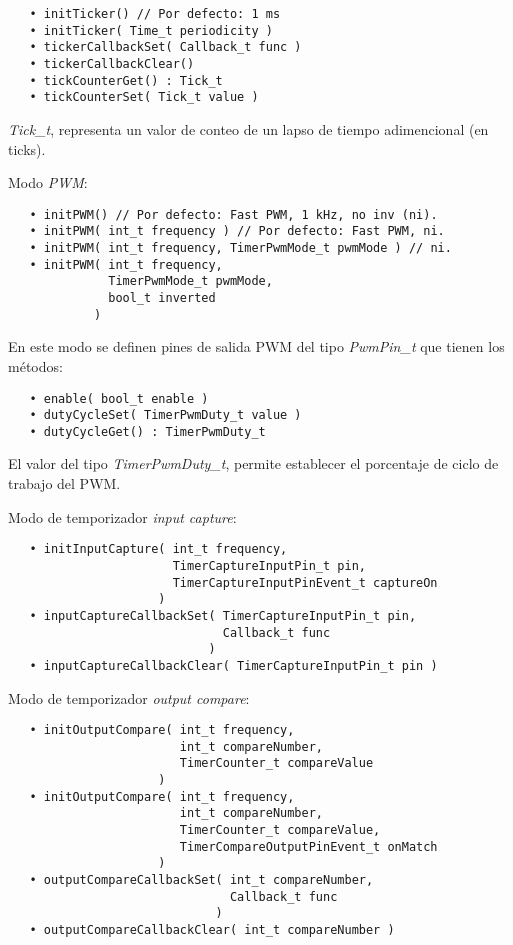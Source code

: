 \begin{verbatim}
   • initTicker() // Por defecto: 1 ms
   • initTicker( Time_t periodicity )
   • tickerCallbackSet( Callback_t func )
   • tickerCallbackClear()
   • tickCounterGet() : Tick_t
   • tickCounterSet( Tick_t value )
\end{verbatim}

\emph{Tick\_t}, representa un valor de conteo de un lapso de tiempo adimencional (en ticks).

Modo \emph{PWM}:

\begin{verbatim}
   • initPWM() // Por defecto: Fast PWM, 1 kHz, no inv (ni).
   • initPWM( int_t frequency ) // Por defecto: Fast PWM, ni.
   • initPWM( int_t frequency, TimerPwmMode_t pwmMode ) // ni.
   • initPWM( int_t frequency, 
              TimerPwmMode_t pwmMode, 
              bool_t inverted 
            )
\end{verbatim}

En este modo se definen pines de salida PWM del tipo \emph{PwmPin\_t} que tienen los métodos:

\begin{verbatim}
   • enable( bool_t enable )
   • dutyCycleSet( TimerPwmDuty_t value )
   • dutyCycleGet() : TimerPwmDuty_t
\end{verbatim}

El valor del tipo \emph{TimerPwmDuty\_t}, permite establecer el porcentaje de ciclo de trabajo del PWM.

Modo de temporizador \emph{input capture}:

\begin{verbatim}
   • initInputCapture( int_t frequency, 
                       TimerCaptureInputPin_t pin,
                       TimerCaptureInputPinEvent_t captureOn
                     )
   • inputCaptureCallbackSet( TimerCaptureInputPin_t pin,
                              Callback_t func
                            )
   • inputCaptureCallbackClear( TimerCaptureInputPin_t pin )
\end{verbatim}

Modo de temporizador \emph{output compare}:

\begin{verbatim}
   • initOutputCompare( int_t frequency,
                        int_t compareNumber,
                        TimerCounter_t compareValue
                     )
   • initOutputCompare( int_t frequency,
                        int_t compareNumber,
                        TimerCounter_t compareValue,
                        TimerCompareOutputPinEvent_t onMatch
                     )
   • outputCompareCallbackSet( int_t compareNumber,
   							   Callback_t func
                             )
   • outputCompareCallbackClear( int_t compareNumber )
\end{verbatim}


